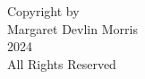 


\begin{center}
\null
\vfill
\begin{doublespace}
Copyright by \\ 
Margaret Devlin Morris \\ 
2024 \\
All Rights Reserved \\
\end{doublespace}
\end{center}
